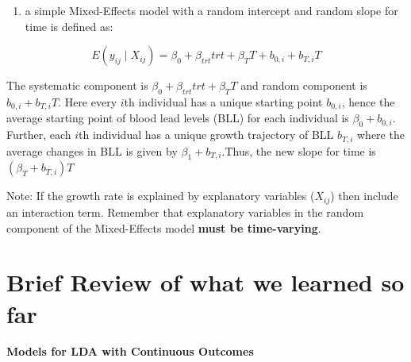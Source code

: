 \documentclass[
  letterpaper,
  DIV=11,
  numbers=noendperiod]{scrreprt}
\providecommand{\tightlist}{%
  \setlength{\itemsep}{0pt}\setlength{\parskip}{0pt}}\usepackage{longtable,booktabs,array}
\begin{document}
\begin{enumerate}
\def\labelenumi{\arabic{enumi})}
\setcounter{enumi}{1}
\tightlist
\item
  a simple Mixed-Effects model with a random intercept and random slope
  for time is defined as:
\end{enumerate}

\[E(y_{ij} \mid X_{ij}) = \beta_0 +  \beta_{trt}trt +  \beta_{T}T + b_{0,i} + b_{T,i}T\]

The systematic component is \(\beta_0 + \beta_{trt}trt + \beta_{T}T\)
and random component is \(b_{0,i} + b_{T,i}T\). Here every \(i\)th
individual has a unique starting point \(b_{0,i}\), hence the average
starting point of blood lead levels (BLL) for each individual is
\(\beta_0 + b_{0,i}\). Further, each \(i\)th individual has a unique
growth trajectory of BLL \(b_{T,i}\) where the average changes in BLL is
given by \(\beta_1 + b_{T,i}\).Thus, the new slope for time is
\((\beta_{T} + b_{T,i})T\)

Note: If the growth rate is explained by explanatory variables
(\(X_{ij}\)) then include an interaction term. Remember that explanatory
variables in the random component of the Mixed-Effects model
\textbf{must be time-varying}.

\hypertarget{brief-review-of-what-we-learned-so-far}{%
\section{Brief Review of what we learned so
far}\label{brief-review-of-what-we-learned-so-far}}

\textbf{Models for LDA with Continuous Outcomes}
\end{document}
